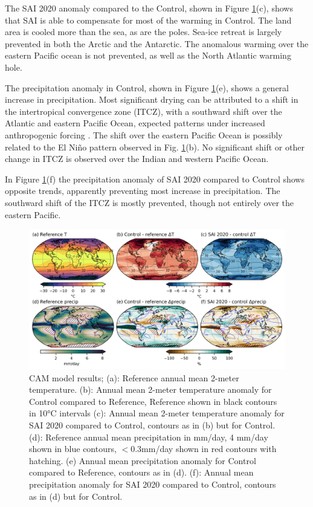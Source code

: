 The SAI 2020 anomaly compared to the Control, shown in Figure \ref{fig:CAM_scens}(c), shows that SAI is able to compensate for most of the warming in Control. The land area is cooled more than the sea, as are the poles. Sea-ice retreat is largely prevented in both the Arctic and the Antarctic. The anomalous warming over the eastern Pacific ocean is not prevented, as well as the North Atlantic warming hole. 

The precipitation anomaly in Control, shown in Figure \ref{fig:CAM_scens}(e), shows a general increase in precipitation. Most significant drying can be attributed to a shift in the intertropical convergence zone (ITCZ), with a southward shift over the Atlantic and eastern Pacific Ocean, expected patterns under increased anthropogenic forcing \parencite{mamalakis2021zonally}. The shift over the eastern Pacific Ocean is possibly related to the El Ni\~no pattern observed in Fig. \ref{fig:CAM_scens}(b). No significant shift or other change in ITCZ is observed over the Indian and western Pacific Ocean.

In Figure \ref{fig:CAM_scens}(f) the precipitation anomaly of SAI 2020 compared to Control shows opposite trends, apparently preventing most increase in precipitation. The southward shift of the ITCZ is mostly prevented, though not entirely over the eastern Pacific.

\begin{figure}[H]
	\centering
	\includegraphics[width=0.95\linewidth]{images/CAM_scens.png}
	\caption{CAM model results; (a): Reference annual mean 2-meter temperature. (b): Annual mean 2-meter temperature anomaly for Control compared to Reference, Reference shown in black contours in 10°C intervals (c): Annual mean 2-meter temperature anomaly for SAI 2020 compared to Control, contours as in (b) but for Control. (d): Reference annual mean precipitation in mm/day, 4 mm/day shown in blue contours, $<0.3$mm/day shown in red contours with hatching. (e) Annual mean precipitation anomaly for Control compared to Reference, contours as in (d). (f): Annual mean precipitation anomaly for SAI 2020 compared to Control, contours as in (d) but for Control.}
	\label{fig:CAM_scens}
\end{figure}



